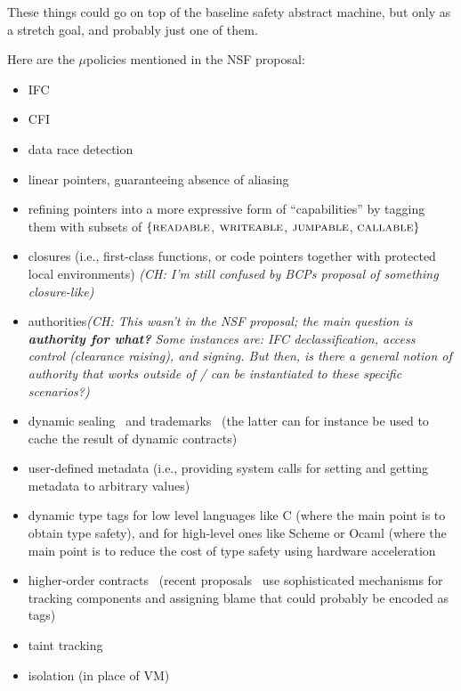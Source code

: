 \documentclass{article}
\newcommand{\ch}[1]{{\color{dkblue}\em (CH: #1)}}
\newcommand*{\IE}{i.e.,\xspace}
\newcommand{\micro}{$\mu$}
\newcommand{\uPs}{\micro policies\xspace}
\begin{document}
These things could go on top of the baseline safety abstract machine,
but only as a stretch goal, and probably just one of them.

\newcommand{\TAG}[1]{\mbox{\sc #1}}

Here are the \uPs mentioned in the NSF proposal:
\begin{itemize}
  \item IFC
  \item CFI
  \item data race detection
  \item linear pointers, guaranteeing absence of aliasing
  \item refining pointers into a more expressive form of
    ``capabilities'' by tagging them with subsets of
    $\{\TAG{readable}$, $\TAG{writeable}$, $\TAG{jumpable}$,
    $\TAG{callable}\}$
  \item closures (\IE first-class functions, or code pointers together
  with protected local environments)
  \ch{I'm still confused by BCPs proposal of something closure-like}
  \item authorities\ch{This wasn't in the NSF proposal; the main
      question is {\bf authority for what?} Some instances are: IFC
      declassification, access control (clearance raising), and
      signing. But then, is there a general notion of authority that
      works outside of / can be instantiated to these specific scenarios?}
  \item dynamic sealing~\cite{Morris::73,SumiiPierce01,SumiiPierce2004}
        and trademarks~\cite{Morris::73} (the latter
    can for instance be used to cache the result of dynamic
    contracts)
  \item user-defined metadata (\IE providing system calls for
    setting and getting metadata to arbitrary values)
  \item dynamic type tags for low level languages like C (where the
    main point is to obtain type safety), and for high-level ones like
    Scheme or Ocaml (where the main point is to reduce the cost of
    type safety using hardware acceleration
  \item higher-order contracts~\cite{FindlerF02}
    (recent proposals~\cite{DimoulasFFF11} use sophisticated mechanisms
     for tracking components and assigning blame that could probably
     be encoded as tags)
  \item taint tracking
  \item isolation (in place of VM)
\end{itemize}
\end{document}
